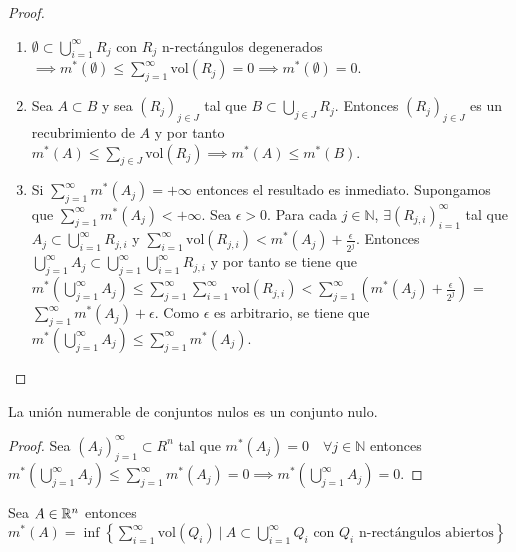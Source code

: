 \begin{proof}
    \leavevmode
    \begin{enumerate}
        \item $\emptyset \subset \bigcup_{i=1}^\infty R_j$ con $R_j$ n-rectángulos degenerados $\implies m^*(\emptyset) \leq \sum_{j=1}^\infty \text{vol}(R_j) = 0 \implies m^*(\emptyset) = 0$.
        \item Sea $A \subset B$ y sea $(R_j)_{j \in J}$ tal que $B \subset \bigcup_{j \in J}
                  R_j$. Entonces $(R_j)_{j \in J}$ es un recubrimiento de $A$ y por tanto $m^*(A)
                  \leq \sum_{j \in J} \text{vol}(R_j) \implies m^*(A) \leq m^*(B)$.
        \item Si $\sum_{j=1}^{\infty}{m^*(A_j)} = +\infty$ entonces el resultado es
              inmediato. Supongamos que $\sum_{j=1}^{\infty}{m^*(A_j)} < +\infty$. Sea
              $\epsilon > 0$. Para cada $j \in \mathbb{N}$, $\exists (R_{j,i})_{i =
                      1}^\infty$ tal que $A_j \subset \bigcup_{i = 1}^\infty R_{j,i}$ y $\sum_{i =
                      1}^\infty \text{vol}(R_{j,i}) < m^*(A_j) + \frac{\epsilon}{2^j}$. Entonces
              $\bigcup_{j=1}^{\infty} A_j \subset \bigcup_{j=1}^{\infty} \bigcup_{i =
                      1}^\infty R_{j,i}$ y por tanto se tiene que $m^*(\bigcup_{j=1}^{\infty} A_j)
                  \leq \sum_{j=1}^{\infty} \sum_{i = 1}^\infty \text{vol}(R_{j,i}) <
                  \sum_{j=1}^{\infty} (m^*(A_j) + \frac{\epsilon}{2^j})$ = $\sum_{j=1}^{\infty}
                  m^*(A_j) + \epsilon$. Como $\epsilon$ es arbitrario, se tiene que
              $m^*(\bigcup_{j=1}^{\infty} A_j) \leq \sum_{j=1}^{\infty} m^*(A_j)$.
    \end{enumerate}
\end{proof}

\begin{corolario}
    La unión numerable de conjuntos nulos es un conjunto nulo.
\end{corolario}

\begin{proof}
    Sea $(A_j)_{j=1}^\infty \subset R^n$ tal que $m^*(A_j) = 0 \quad \forall j \in \mathbb{N}$ entonces $m^*(\bigcup_{j=1}^\infty A_j) \leq \sum_{j=1}^\infty m^*(A_j) = 0 \implies m^*(\bigcup_{j=1}^\infty A_j) = 0$.
\end{proof}

\begin{lema}
    Sea $A \in \mathbb{R}^n$ entonces $m^*(A) = \inf \left\{ \sum_{i=1}^\infty \text{vol}(Q_i) \ | \ A \subset \bigcup_{i=1}^\infty Q_i \text{ con } Q_i \text{ n-rectángulos abiertos} \right\}$
\end{lema}

